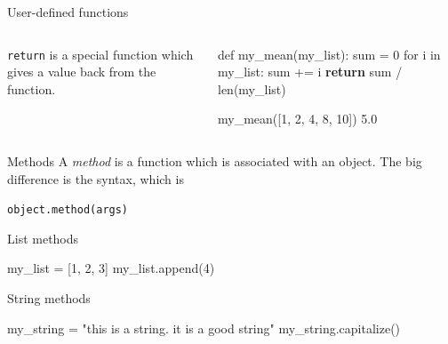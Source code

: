 \documentclass{beamer}
\begin{document}
\begin{frame}[fragile]{User-defined functions}
    \begin{columns}
        \begin{column}{0.3\textwidth}
            \texttt{return} is a special function which gives a value back from the function.
        \end{column}
        \begin{column}{0.7\textwidth}
        \small
\begin{block}{}
\begin{semiverbatim}
    def my_mean(my_list):
        sum = 0
        for i in my_list:
            sum += i
        \textbf{return} sum / len(my_list)

    my_mean([1, 2, 4, 8, 10])
    5.0
\end{semiverbatim}
\end{block}  
        \end{column}
    \end{columns}
\end{frame}


\begin{frame}{Methods}
    A \textit{method} is a function which is associated with an object. The big difference is the syntax, which is
    \begin{center}
        \texttt{object.method(args)}
    \end{center}
\end{frame}

\begin{frame}[fragile]{List methods}
\begin{semiverbatim}
    my_list = [1, 2, 3]
    my_list.append(4)




\end{semiverbatim}
\end{frame}

\begin{frame}[fragile]{String methods}
\small
\begin{semiverbatim}
    my_string = "this is a string. it is a good string"
    my_string.capitalize()




\end{semiverbatim}
\end{frame}
\end{document}
